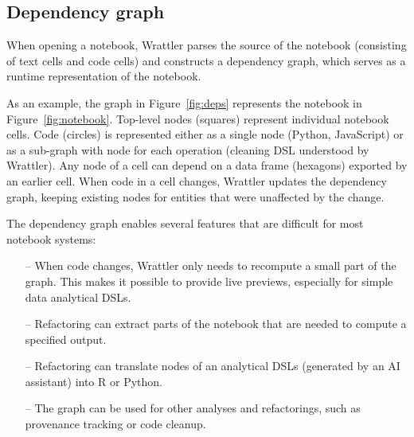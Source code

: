 \documentclass[sigplan,preprint,10pt]{acmart}\settopmatter{printfolios=true,printccs=false,printacmref=false}
\theoremstyle{plain}
\theoremstyle{definition}
\begin{document}
\subsection{Dependency graph}

When opening a notebook, Wrattler parses the source of the notebook (consisting of text cells and
code cells) and constructs a dependency graph, which serves as a runtime representation of the
notebook.

As an example, the graph in Figure~\ref{fig:deps} represents the notebook in Figure~\ref{fig:notebook}.
Top-level nodes (squares) represent individual notebook cells. Code (circles) is represented either as
a single node (Python, JavaScript) or as a sub-graph with node for each operation (cleaning DSL
understood by Wrattler). Any node of a cell can depend on a data frame (hexagons) exported by an
earlier cell. When code in a cell changes, Wrattler updates the dependency graph, keeping existing
nodes for entities that were unaffected by the change.

The dependency graph enables several features that are difficult for most notebook systems:
%
\begin{itemize}
\item[--] When code changes, Wrattler only needs to recompute a small part of the graph.
  This makes it possible to provide live previews, especially for simple data analytical DSLs.
\vspace{-0.85em}
\item[--] Refactoring can extract parts of the notebook that
  are needed to compute a specified output.
\vspace{0.25em}
\item[--] Refactoring can translate nodes of an analytical DSLs (generated by an AI assistant) into R or Python.
\vspace{0.25em}
\item[--] The graph can be used for other analyses and refactorings, such as provenance tracking
  or code cleanup.
\end{itemize}
\end{document}
